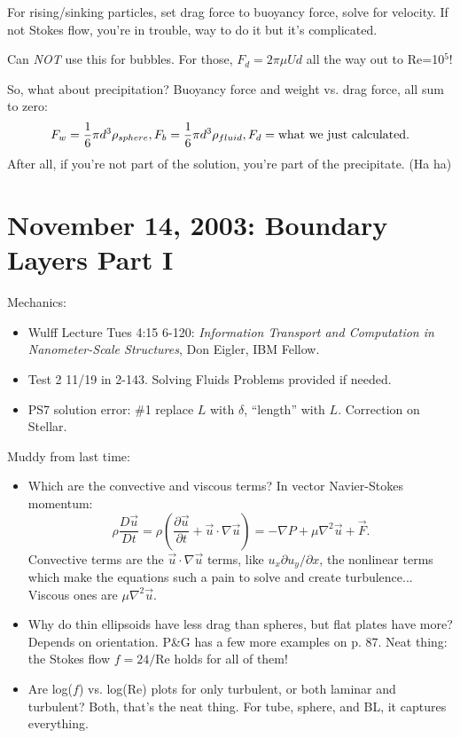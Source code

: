 \documentclass{report}
\begin{document}
For rising/sinking particles, set drag force to buoyancy force, solve for
velocity.  If not Stokes flow, you're in trouble, way to do it but it's
complicated.

Can {\em NOT} use this for bubbles.  For those, $F_d=2\pi\mu Ud$ all the way
out to Re=10$^5$!

So, what about precipitation?  Buoyancy force and weight vs. drag force, all
sum to zero:
$$F_w = \frac{1}{6}\pi d^3\rho_{sphere}, F_b = \frac{1}{6}\pi d^3\rho_{fluid},
F_d = {\rm what\ we\ just\ calculated}.$$
After all, if you're not part of the solution, you're part of the precipitate.
(Ha ha)
\newpage


\section{November 14, 2003: Boundary Layers Part I}

Mechanics:
\begin{itemize}
\item Wulff Lecture Tues 4:15 6-120: {\em Information Transport and Computation
    in Nanometer-Scale Structures}, Don Eigler, IBM Fellow.
\item Test 2 11/19 in 2-143.  Solving Fluids Problems provided if needed.
\item PS7 solution error: \#1 replace $L$ with $\delta$, ``length'' with $L$.
  Correction on Stellar.
\end{itemize}

\noindent Muddy from last time:
\begin{itemize}
\item Which are the convective and viscous terms?  In vector Navier-Stokes
  momentum:
  $$\rho\frac{D\vec{u}}{Dt} = \rho\left(\frac{\partial\vec{u}}{\partial t} +
    \vec{u}\cdot\nabla\vec{u}\right) = -\nabla P + \mu\nabla^2\vec{u} +
  \vec{F}.$$
  Convective terms are the $\vec{u}\cdot\nabla\vec{u}$ terms, like $u_x\partial
  u_y/\partial x$, the nonlinear terms which make the equations such a pain to
  solve and create turbulence...  Viscous ones are $\mu\nabla^2\vec{u}$.
\item Why do thin ellipsoids have less drag than spheres, but flat plates have
  more?  Depends on orientation.  P\&G has a few more examples on p. 87.  Neat
  thing: the Stokes flow $f=24/$Re holds for all of them!
\item Are log($f$) vs. log(Re) plots for only turbulent, or both laminar and
  turbulent?  Both, that's the neat thing.  For tube, sphere, and BL, it
  captures everything.
\end{itemize}
\end{document}
